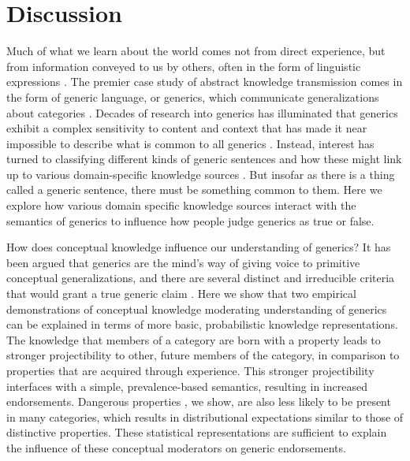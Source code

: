 \documentclass[floatsintext, 11pt, doc]{apa6}
\newcommand{\red}[1]{\textcolor{Red}{#1}}
\begin{document}
\section{Discussion}

Much of what we learn about the world comes not from direct experience, but from information conveyed to us by others, often in the form of linguistic expressions \cite{Henrich2015, boyd1988culture} . 
The premier case study of abstract knowledge transmission comes in the form of generic language, or generics, which communicate generalizations about categories \cite{Carlson1977, Gelman2009, Rhodes2012}.
Decades of research into generics has illuminated that generics exhibit a complex sensitivity to content and context that has made it near impossible to describe what is common to all generics \cite{Carlson1995, Leslie2007, Sterken2015, Nickel2016, Cohen1999}.
Instead, interest has turned to classifying different kinds of generic sentences and how these might link up to various domain-specific knowledge sources \cite{Prasada2013, Cimpian2010, Gelman2007, tasimi2017differences}.
But insofar as there is a thing called a generic sentence, there must be something common to them. 
Here we explore how various domain specific knowledge sources interact with the semantics of generics to influence how people judge generics as true or false. 

How does conceptual knowledge influence our understanding of generics? 
It has been argued that generics are the mind's way of giving voice to primitive conceptual generalizations, and there are several distinct and irreducible criteria that would grant a true generic claim \cite{Leslie2007}.
Here we show that two empirical demonstrations of conceptual knowledge moderating understanding of generics can be explained in terms of more basic, probabilistic knowledge representations. 
The knowledge that members of a category are born with a property \cite{Gelman2007} leads to stronger projectibility to other, future members of the category, in comparison to properties that are acquired through experience.
This stronger projectibility interfaces with a simple, prevalence-based semantics, resulting in increased endorsements.
Dangerous properties \cite{Cimpian2010}, we show, are also less likely to be present in many categories, which results in distributional expectations similar to those of distinctive properties. 
These statistical representations are sufficient to explain the influence of these conceptual moderators on generic endorsements. 
\end{document}
